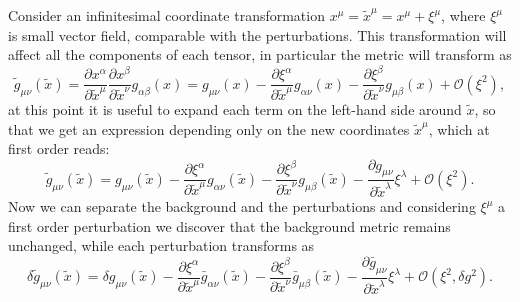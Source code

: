 Consider an infinitesimal coordinate transformation $x^\mu= \tilde x^\mu=x^\mu+\xi^\mu$, where $\xi^\mu$ is small vector field, comparable with the perturbations. This transformation will affect all the components of each tensor, in particular the metric will transform as
$$\tilde g_{\mu\nu}(\tilde x)=\frac{\partial x^\alpha}{\partial\tilde  x^\mu}\frac{\partial  x^\beta}{\partial\tilde x^\nu}g_{\alpha\beta}(x)=g_{\mu\nu}(x)-\frac{\partial \xi^\alpha}{\partial\tilde x^\mu}g_{\alpha\nu}(x)-\frac{\partial \xi^\beta}{\partial\tilde x^\nu}g_{\mu\beta}(x)+\mathcal O(\xi^2),$$
at this point it is useful to expand each term on the left-hand side around $\tilde x$, so that we get an expression depending only on the new coordinates $\tilde x^\mu$, which at first order reads:
$$\tilde g_{\mu\nu}(\tilde x)=g_{\mu\nu}(\tilde x)-\frac{\partial \xi^\alpha}{\partial \tilde x^\mu}g_{\alpha\nu}(\tilde x)-\frac{\partial \xi^\beta}{\partial \tilde x^\nu}g_{\mu\beta}(\tilde x)-\frac{\partial g_{\mu\nu}}{\partial \tilde x^\lambda}\xi^\lambda+\mathcal O(\xi^2).$$
Now we can separate the background and the perturbations and considering $\xi^\mu$ a first order perturbation we discover that the background metric remains unchanged, while each perturbation transforms as
\begin{equation}
     \delta \tilde g_{\mu\nu}(\tilde x)=\delta g_{\mu\nu}(\tilde x)-\frac{\partial \xi^\alpha}{\partial \tilde x^\mu}\bar g_{\alpha\nu}(\tilde x)-\frac{\partial \xi^\beta}{\partial \tilde x^\nu}\bar g_{\mu\beta}(\tilde x)-\frac{\partial\bar g_{\mu\nu}}{\partial \tilde x^\lambda}\xi^\lambda+\mathcal O(\xi^2,\delta g^2).
    \label{eq:perturbation_transformation}
\end{equation} 

